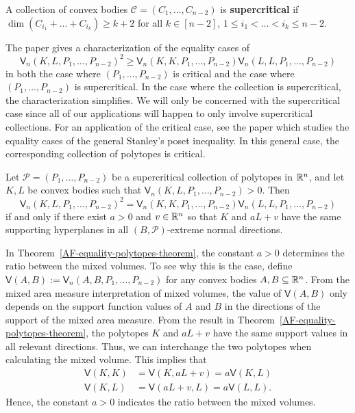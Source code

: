 \documentclass{puthesis-UG}
\begin{document}
\begin{defn}
	A collection of convex bodies $\mathcal{C} = (C_1, \ldots, C_{n-2})$ is \textbf{supercritical} if $\dim (C_{i_1} + \ldots + C_{i_k}) \geq k+2$ for all $k \in [n-2]$, $1 \leq i_1 < \ldots < i_k \leq n-2$. 
\end{defn} 

The paper \cite{shenfeld2022extremals} gives a characterization of the equality cases of 
\[
	\mathsf{V}_n(K, L, P_1, \ldots, P_{n-2})^2 \geq \mathsf{V}_n (K, K, P_1, \ldots, P_{n-2}) \mathsf{V}_n (L, L, P_1, \ldots, P_{n-2})
\]
in both the case where $(P_1, \ldots, P_{n-2})$ is critical and the case where $(P_1, \ldots, P_{n-2})$ is supercritical. In the case where the collection is supercritical, the characterization simplifies. We will only be concerned with the supercritical case since all of our applications will happen to only involve supercritical collections. For an application of the critical case, see the paper \cite{ma2022extremals} which studies the equality cases of the general Stanley's poset inequality. In this general case, the corresponding collection of polytopes is critical.
	
\begin{thm} \label{AF-equality-polytopes-theorem}
	Let $\mathcal{P} = (P_1, \ldots, P_{n-2})$ be a supercritical collection of polytopes in $\mathbb{R}^n$, and let $K, L$ be convex bodies such that $\mathsf{V}_n (K, L, P_1, \ldots, P_{n-2}) > 0$. Then 
	\[
		\mathsf{V}_n (K, L, P_1, \ldots, P_{n-2})^2 = \mathsf{V}_n (K, K, P_1, \ldots, P_{n-2}) \mathsf{V}_n (L, L, P_1, \ldots, P_{n-2})
	\]
	if and only if there exist $a > 0$ and $v \in \mathbb{R}^n$ so that $K$ and $a L + v$ have the same supporting hyperplanes in all $(B, \mathcal{P})$-extreme normal directions.
\end{thm}

In Theorem~\ref{AF-equality-polytopes-theorem}, the constant $a > 0$ determines the ratio between the mixed volumes. To see why this is the case, define $\mathsf{V} (A, B) := \mathsf{V}_n(A, B, P_1, \ldots, P_{n-2})$ for any convex bodies $A, B \subseteq \mathbb{R}^n$. From the mixed area measure interpretation of mixed volumes, the value of $\mathsf{V}(A, B)$ only depends on the support function values of $A$ and $B$ in the directions of the support of the mixed area measure. From the result in Theorem~\ref{AF-equality-polytopes-theorem}, the polytopes $K$ and $aL+v$ have the same support values in all relevant directions. Thus, we can interchange the two polytopes when calculating the mixed volume. This implies that
\begin{align*}
	\mathsf{V}(K, K) & = \mathsf{V}(K, aL + v) = a \mathsf{V}(K, L) \\
	\mathsf{V}(K, L) & = \mathsf{V}(aL+v, L) = a \mathsf{V} (L, L).
\end{align*}
Hence, the constant $a > 0$ indicates the ratio between the mixed volumes. 
\end{document}
